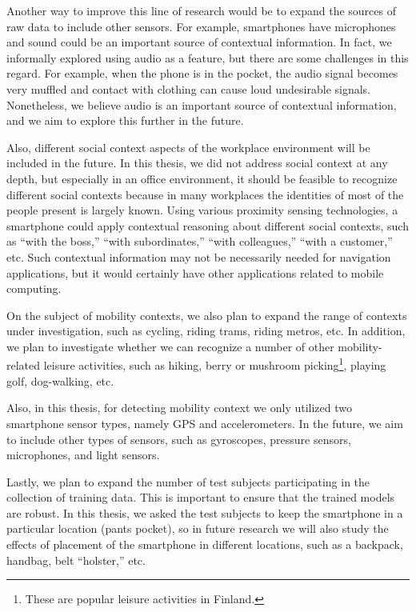 Another way to improve this line of research would be to expand the sources of raw data to include other sensors. For example, smartphones have microphones and sound could be an important source of contextual information. In fact, we informally explored using audio as a feature, but there are some challenges in this regard. For example, when the phone is in the pocket, the audio signal becomes very muffled and contact with clothing can cause loud undesirable signals. Nonetheless, we believe audio is an important source of contextual information, and we aim to explore this further in the future.

Also, different social context aspects of the workplace environment will be included in the future. In this thesis, we did not address social context at any depth, but especially in an office environment, it should be feasible to recognize different social contexts because in many workplaces the identities of most of the people present is largely known. Using various proximity sensing technologies, a smartphone could apply contextual reasoning about different social contexts, such as ``with the boss,'' ``with subordinates,'' ``with colleagues,'' ``with a customer,'' etc. Such contextual information may not be necessarily needed for navigation applications, but it would certainly have other applications related to mobile computing.

On the subject of mobility contexts, we also plan to expand the range of contexts under investigation, such as cycling, riding trams, riding metros, etc. In addition, we plan to investigate whether we can recognize a number of other mobility-related leisure activities, such as hiking, berry or mushroom picking\footnote{These are popular leisure activities in Finland.}, playing golf, dog-walking, etc.

Also, in this thesis, for detecting mobility context we only utilized two smartphone sensor types, namely GPS and accelerometers. In the future, we aim to include other types of sensors, such as gyroscopes, pressure sensors, microphones, and light sensors.

Lastly, we plan to expand the number of test subjects participating in the collection of training data. This is important to ensure that the trained models are robust. In this thesis, we asked the test subjects to keep the smartphone in a particular location (pants pocket), so in future research we will also study the effects of placement of the smartphone in different locations, such as a backpack, handbag, belt ``holster,'' etc.

